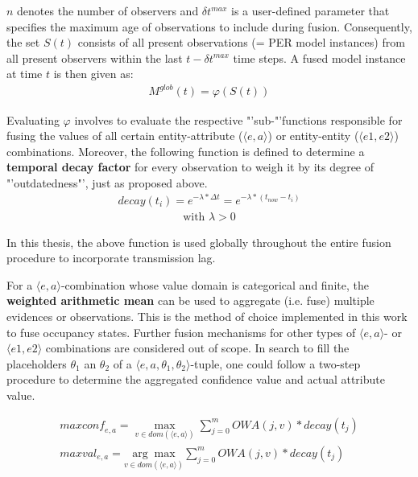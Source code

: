 $n$ denotes the number of observers and $\delta t^{max}$ is a user-defined parameter that specifies the maximum age of observations to include during fusion. Consequently, the set $S(t)$ consists of all present observations (= PER model instances) from all present observers within the last $t - \delta t^{max}$ time steps. A fused model instance at time $t$ is then given as:
\begin{gather}
	M^{glob}(t) = \varphi(S(t))
\end{gather}

Evaluating $\varphi$ involves to evaluate the respective "'sub-"'functions responsible for fusing the values of all certain entity-attribute ($\langle e, a \rangle$) or entity-entity ($\langle e1, e2 \rangle$) combinations. Moreover, the following function is defined to determine a \textbf{temporal decay factor} for every observation to weigh it by its degree of "'outdatedness"', just as proposed above.
\begin{gather}
	\textit{decay}(t_i) = e^{-\lambda * \Delta t} = e^{-\lambda * (t_{now} - t_i)}
	\label{eq:decay}
\end{gather}
\vspace{-8ex}
\begin{gather*}
	\text{with\ } \lambda > 0
\end{gather*}

In this thesis, the above function is used globally throughout the entire fusion procedure to incorporate transmission lag.
\par
\bigskip

For a $\langle e, a \rangle$-combination whose value domain is categorical and finite, the \textbf{weighted arithmetic mean} can be used to aggregate (i.e. fuse) multiple evidences or observations. This is the method of choice implemented in this work to fuse occupancy states. Further fusion mechanisms for other types of $\langle e, a \rangle$- or $\langle e1, e2 \rangle$ combinations are considered out of scope. In search to fill the placeholders $\theta_1$ an $\theta_2$ of a $\langle e, a, \theta_1, \theta_2 \rangle$-tuple, one could follow a two-step procedure to determine the aggregated confidence value and actual attribute value.

\begin{gather*}
	\textit{maxconf}_{e,a} = \underset{v \in \textit{dom}(\langle e, a \rangle)}{\max} \sum_{j = 0}^{m} \textit{OWA}(j, v) * \textit{decay}(t_j) \\\textit{maxval}_{e,a} = \underset{v \in \textit{dom}(\langle e, a \rangle)}{\arg\max} \sum_{j = 0}^{m} \textit{OWA}(j, v) * \textit{decay}(t_j) \\
\end{gather*}

